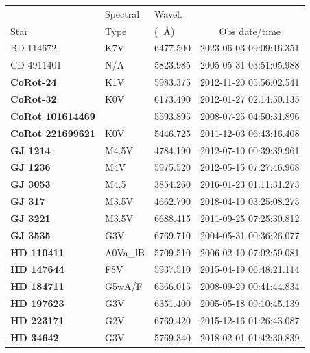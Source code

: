 \documentclass[linenumbers]{aastex701}
\providecommand{\DIFadd}[1]{{\bf #1}} %
\providecommand{\DIFaddFL}[1]{\DIFadd{#1}} %
\providecommand{\DIFaddbeginFL}{} %
\providecommand{\DIFaddendFL}{} %
\begin{document}
\begin{table}
\centering
\begin{tabular}{|l|l|l|c|}
\hline
     & Spectral& Wavel.& \\
Star & Type & (\DIFaddbeginFL \DIFaddFL{~}\DIFaddendFL \AA) & Obs date/time \\
\hline
BD-114672 & K7V & 6477.500 & 2023-06-03 09:09:16.351 \\
CD-4911401 & N/A & 5823.985 & 2005-05-31 03:51:05.988 \\
 \DIFaddbeginFL \DIFaddFL{CoRot-24 }\DIFaddendFL & K1V & 5983.375 & 2012-11-20 05:56:02.541 \\
 \DIFaddbeginFL \DIFaddFL{CoRot-32 }\DIFaddendFL & K0V & 6173.490 & 2012-01-27 02:14:50.135 \\
 \DIFaddbeginFL \DIFaddFL{CoRot 101614469 }\DIFaddendFL &  & 5593.895 & 2008-07-25 04:50:31.896 \\
 \DIFaddbeginFL \DIFaddFL{CoRot 221699621 }\DIFaddendFL & K0V & 5446.725 & 2011-12-03 06:43:16.408 \\
 \DIFaddbeginFL \DIFaddFL{GJ 1214 }\DIFaddendFL & M4.5V & 4784.190 & 2012-07-10 00:39:39.961 \\
 \DIFaddbeginFL \DIFaddFL{GJ 1236 }\DIFaddendFL & M4V & 5975.520 & 2012-05-15 07:27:46.968 \\
 \DIFaddbeginFL \DIFaddFL{GJ 3053 }\DIFaddendFL & M4.5 & 3854.260 & 2016-01-23 01:11:31.273 \\
 \DIFaddbeginFL \DIFaddFL{GJ 317 }\DIFaddendFL & M3.5V & 4662.790 & 2018-04-10 03:25:08.275 \\
 \DIFaddbeginFL \DIFaddFL{GJ 3221 }\DIFaddendFL & M3.5V & 6688.415 & 2011-09-25 07:25:30.812 \\
 \DIFaddbeginFL \DIFaddFL{GJ 3535 }\DIFaddendFL & G3V & 6769.710 & 2004-05-31 00:36:26.077 \\
 \DIFaddbeginFL \DIFaddFL{HD 110411 }\DIFaddendFL & A0Va\_lB & 5709.510 & 2006-02-10 07:02:59.081 \\
 \DIFaddbeginFL \DIFaddFL{HD 147644 }\DIFaddendFL & F8V & 5937.510 & 2015-04-19 06:48:21.114 \\
 \DIFaddbeginFL \DIFaddFL{HD 184711 }\DIFaddendFL & G5wA/F & 6566.015 & 2008-09-20 00:41:44.834 \\
 \DIFaddbeginFL \DIFaddFL{HD 197623 }\DIFaddendFL & G3V & 6351.400 & 2005-05-18 09:10:45.139 \\
 \DIFaddbeginFL \DIFaddFL{HD 223171 }\DIFaddendFL & G2V & 6769.420 & 2015-12-16 01:26:43.087 \\
 \DIFaddbeginFL \DIFaddFL{HD 34642 }\DIFaddendFL & G3V & 5769.340 & 2018-02-01 01:42:30.839 \\

\end{tabular}
\end{table}
\end{document}
